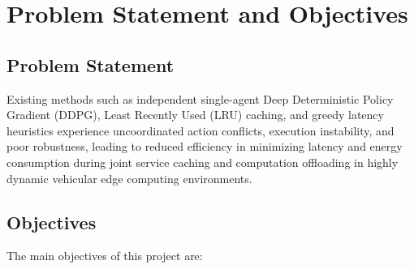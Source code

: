 \documentclass[12pt,a4paper]{report}
\begin{document}
\chapter{Problem Statement and Objectives}

\section{Problem Statement}

Existing methods such as independent single-agent Deep Deterministic Policy Gradient (DDPG), Least Recently Used (LRU) caching, and greedy latency heuristics experience uncoordinated action conflicts, execution instability, and poor robustness, leading to reduced efficiency in minimizing latency and energy consumption during joint service caching and computation offloading in highly dynamic vehicular edge computing environments.


\section{Objectives}

The main objectives of this project are:
\end{document}

